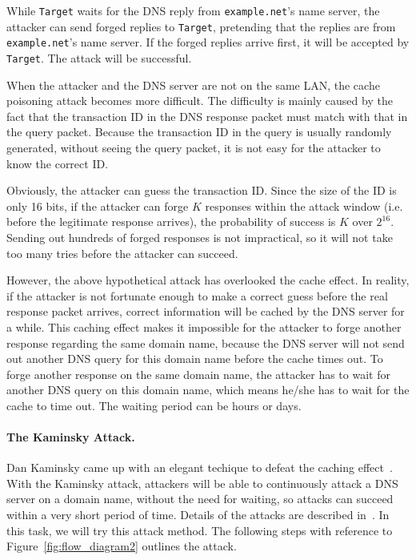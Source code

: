 While {\tt Target} waits for the DNS reply from {\tt example.net}'s name
server, the attacker can send forged replies to {\tt Target}, pretending 
that the replies are from {\tt example.net}'s name server. If the forged 
replies arrive first, it will be accepted by {\tt Target}. The attack will
be successful.



When the attacker and the DNS server are not on the same LAN,
the cache poisoning attack becomes more difficult.
The difficulty is mainly caused by the fact that the transaction ID
in the DNS response packet must match with that 
in the query packet. Because the transaction ID in the query is 
usually randomly generated, without seeing the query packet,
it is not easy for the attacker to know the correct ID.


Obviously, the attacker can guess the transaction ID. Since the
size of the ID is only 16 bits, if the attacker can forge $K$ 
responses within the attack window (i.e. before the legitimate
response arrives), the probability of success is $K$ over $2^{16}$.
Sending out hundreds of forged responses is not impractical, so
it will not take too many tries before the attacker can succeed. 


However, the above hypothetical attack has overlooked the cache effect.
In reality, if the attacker is not fortunate enough to make a correct guess before
the real response packet arrives, correct information will be cached 
by the DNS server for a while. This caching effect makes it impossible
for the attacker to forge another response regarding the same 
domain name, because the DNS server will not send out another DNS query for 
this domain name before the cache times out.
To forge another response on the same domain name, the attacker has to 
wait for another DNS query on this domain name, which means he/she has to
wait for the cache to time out. The waiting period can be hours or days.


\paragraph{The Kaminsky Attack.} 
Dan Kaminsky came up with an elegant techique to defeat the caching effect~\cite{Kaminsky}.
With the Kaminsky attack, attackers will be able to continuously attack
a DNS server on a domain name, without the need for waiting, so
attacks can succeed within a very short period of time.
Details of the attacks are described in~\cite{Kaminsky}. 
In this task, we will try this attack method. The following steps with reference to 
Figure~\ref{fig:flow_diagram2} outlines the attack. 


